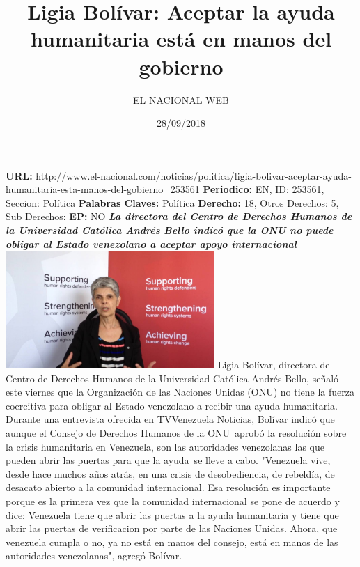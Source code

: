 \documentclass{article}%
\title{\textbf{Ligia Bolívar: Aceptar la ayuda humanitaria está en manos del gobierno}}%
\author{EL NACIONAL WEB}%
\date{28/09/2018}%
\begin{document}
%
\normalsize%
\maketitle%
\textbf{URL: }%
http://www.el{-}nacional.com/noticias/politica/ligia{-}bolivar{-}aceptar{-}ayuda{-}humanitaria{-}esta{-}manos{-}del{-}gobierno\_253561\newline%
%
\textbf{Periodico: }%
EN, %
ID: %
253561, %
Seccion: %
Política\newline%
%
\textbf{Palabras Claves: }%
Política\newline%
%
\textbf{Derecho: }%
18, %
Otros Derechos: %
5, %
Sub Derechos: %
\newline%
%
\textbf{EP: }%
NO\newline%
\newline%
%
\textbf{\textit{La directora del Centro de Derechos Humanos de la Universidad Católica Andrés Bello indicó que la ONU no puede obligar al Estado venezolano a aceptar apoyo internacional}}%
\newline%
\newline%
%
\includegraphics[width=300px]{121.jpg}%
\newline%
%
Ligia Bolívar, directora del Centro de Derechos Humanos de la Universidad Católica Andrés Bello, señaló este viernes que la Organización de las Naciones Unidas (ONU) no tiene la fuerza coercitiva para obligar al Estado venezolano a recibir una ayuda humanitaria.%
\newline%
%
Durante una entrevista ofrecida en TVVenezuela Noticias, Bolívar indicó que aunque el Consejo de Derechos Humanos de la ONU~aprobó la resolución sobre la crisis humanitaria en Venezuela, son las autoridades venezolanas las que pueden abrir las puertas para que la ayuda~se lleve a cabo.%
\newline%
%
"Venezuela vive, desde hace muchos años atrás, en una crisis de desobediencia, de rebeldía, de desacato abierto a la comunidad internacional. Esa resolución es importante porque es la primera vez que la comunidad internacional se pone de acuerdo y dice: Venezuela tiene que abrir las puertas a la ayuda humanitaria y tiene que abrir las puertas de verificacion por parte de las Naciones Unidas. Ahora, que venezuela cumpla o no, ya no está en manos del consejo, está en manos de las autoridades venezolanas", agregó Bolívar.%
\newline%
%
\end{document}
